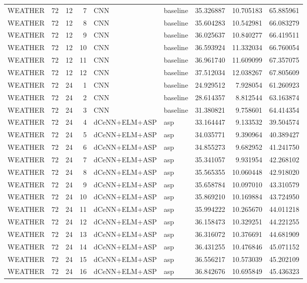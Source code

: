 \begin{table}
\begin{tabular}{lrrrllrrr}
WEATHER & 72 & 12 & 7 & CNN & baseline & 35.326887 & 10.705183 & 65.885961 \\
WEATHER & 72 & 12 & 8 & CNN & baseline & 35.604283 & 10.542981 & 66.083279 \\
WEATHER & 72 & 12 & 9 & CNN & baseline & 36.025637 & 10.840277 & 66.419511 \\
WEATHER & 72 & 12 & 10 & CNN & baseline & 36.593924 & 11.332034 & 66.760054 \\
WEATHER & 72 & 12 & 11 & CNN & baseline & 36.961740 & 11.609099 & 67.357075 \\
WEATHER & 72 & 12 & 12 & CNN & baseline & 37.512034 & 12.038267 & 67.805609 \\
WEATHER & 72 & 24 & 1 & CNN & baseline & 24.929512 & 7.928054 & 61.260923 \\
WEATHER & 72 & 24 & 2 & CNN & baseline & 28.614357 & 8.812544 & 63.163874 \\
WEATHER & 72 & 24 & 3 & CNN & baseline & 31.380821 & 9.758601 & 64.414354 \\
WEATHER & 72 & 24 & 4 & dCeNN+ELM+ASP & asp & 33.164447 & 9.133532 & 39.504574 \\
WEATHER & 72 & 24 & 5 & dCeNN+ELM+ASP & asp & 34.035771 & 9.390964 & 40.389427 \\
WEATHER & 72 & 24 & 6 & dCeNN+ELM+ASP & asp & 34.855273 & 9.682952 & 41.241750 \\
WEATHER & 72 & 24 & 7 & dCeNN+ELM+ASP & asp & 35.341057 & 9.931954 & 42.268102 \\
WEATHER & 72 & 24 & 8 & dCeNN+ELM+ASP & asp & 35.565355 & 10.060448 & 42.918020 \\
WEATHER & 72 & 24 & 9 & dCeNN+ELM+ASP & asp & 35.658784 & 10.097010 & 43.310579 \\
WEATHER & 72 & 24 & 10 & dCeNN+ELM+ASP & asp & 35.869210 & 10.169884 & 43.724950 \\
WEATHER & 72 & 24 & 11 & dCeNN+ELM+ASP & asp & 35.994222 & 10.265670 & 44.011218 \\
WEATHER & 72 & 24 & 12 & dCeNN+ELM+ASP & asp & 36.158473 & 10.329251 & 44.221255 \\
WEATHER & 72 & 24 & 13 & dCeNN+ELM+ASP & asp & 36.316072 & 10.376691 & 44.681909 \\
WEATHER & 72 & 24 & 14 & dCeNN+ELM+ASP & asp & 36.431255 & 10.476846 & 45.071152 \\
WEATHER & 72 & 24 & 15 & dCeNN+ELM+ASP & asp & 36.556217 & 10.573039 & 45.202109 \\
WEATHER & 72 & 24 & 16 & dCeNN+ELM+ASP & asp & 36.842676 & 10.695849 & 45.436323 \\

\end{tabular}
\end{table}
